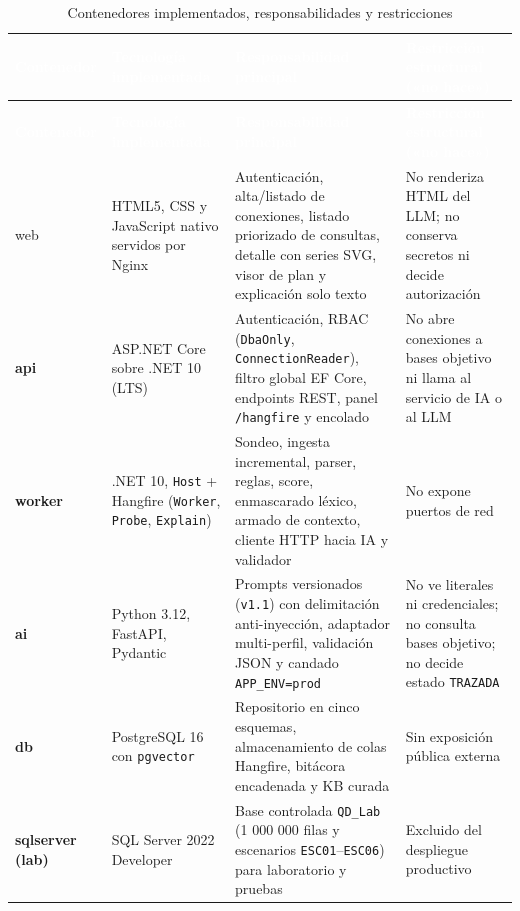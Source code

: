 \documentclass[12pt,a4paper]{article}
\begin{document}
\begingroup
{}
\scriptsize
\begin{longtable}{>{\bfseries}p{} p{} p{} p{}}
\toprule
\rowcolor{utbblue}
\textcolor{white}{\textbf{Contenedor}} & \textcolor{white}{\textbf{Tecnología implementada}} & \textcolor{white}{\textbf{Responsabilidad principal}} & \textcolor{white}{\textbf{Restricción estructural («no hace»)}} \\
\midrule
\endfirsthead
\toprule
\rowcolor{utbblue}
\textcolor{white}{\textbf{Contenedor}} & \textcolor{white}{\textbf{Tecnología implementada}} & \textcolor{white}{\textbf{Responsabilidad principal}} & \textcolor{white}{\textbf{Restricción estructural («no hace»)}} \\
\midrule
\endhead
\bottomrule
\caption{Contenedores implementados, responsabilidades y restricciones}
\label{tab:contenedores}
\endlastfoot
web & HTML5, CSS y JavaScript nativo servidos por Nginx & Autenticación, alta/listado de conexiones, listado priorizado de consultas, detalle con series SVG, visor de plan y explicación solo texto & No renderiza HTML del LLM; no conserva secretos ni decide autorización \\
api & ASP.NET Core sobre .NET 10 (LTS) & Autenticación, RBAC (\texttt{DbaOnly}, \texttt{ConnectionReader}), filtro global EF Core, endpoints REST, panel \texttt{/hangfire} y encolado & No abre conexiones a bases objetivo ni llama al servicio de IA o al LLM \\
worker & .NET 10, \texttt{Host} + Hangfire (\texttt{Worker}, \texttt{Probe}, \texttt{Explain}) & Sondeo, ingesta incremental, parser, reglas, score, enmascarado léxico, armado de contexto, cliente HTTP hacia IA y validador & No expone puertos de red \\
ai & Python 3.12, FastAPI, Pydantic & Prompts versionados (\texttt{v1.1}) con delimitación anti-inyección, adaptador multi-perfil, validación JSON y candado \texttt{APP\_ENV=prod} & No ve literales ni credenciales; no consulta bases objetivo; no decide estado \texttt{TRAZADA} \\
db & PostgreSQL 16 con \texttt{pgvector} & Repositorio en cinco esquemas, almacenamiento de colas Hangfire, bitácora encadenada y KB curada & Sin exposición pública externa \\
sqlserver (lab) & SQL Server 2022 Developer & Base controlada \texttt{QD\_Lab} (1 000 000 filas y escenarios \texttt{ESC01}--\texttt{ESC06}) para laboratorio y pruebas & Excluido del despliegue productivo \\
\end{longtable}
\endgroup
\end{document}
